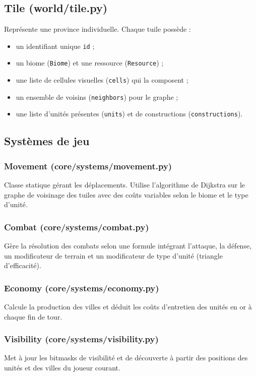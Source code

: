 \documentclass[12pt, a4paper]{article}
\begin{document}
\subsection{Tile (world/tile.py)}

Représente une province individuelle. Chaque tuile possède :
\begin{itemize}
    \item un identifiant unique \texttt{id} ;
    \item un biome (\texttt{Biome}) et une ressource (\texttt{Resource}) ;
    \item une liste de cellules visuelles (\texttt{cells}) qui la composent ;
    \item un ensemble de voisins (\texttt{neighbors}) pour le graphe ;
    \item une liste d'unités présentes (\texttt{units}) et de constructions (\texttt{constructions}).
\end{itemize}

\subsection{Systèmes de jeu}

\subsubsection{Movement (core/systems/movement.py)}
Classe statique gérant les déplacements. Utilise l'algorithme de Dijkstra sur le graphe de
voisinage des tuiles avec des coûts variables selon le biome et le type d'unité.

\subsubsection{Combat (core/systems/combat.py)}
Gère la résolution des combats selon une formule intégrant l'attaque, la défense, un
modificateur de terrain et un modificateur de type d'unité (triangle d'efficacité).

\subsubsection{Economy (core/systems/economy.py)}
Calcule la production des villes et déduit les coûts d'entretien des unités en or à chaque
fin de tour.

\subsubsection{Visibility (core/systems/visibility.py)}
Met à jour les bitmasks de visibilité et de découverte à partir des positions des unités et
des villes du joueur courant.
\end{document}
